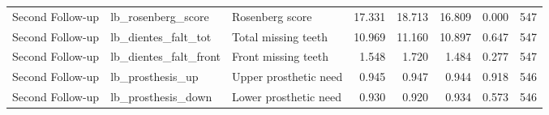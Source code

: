 \begin{table}
\begin{tabular}[t]{lllrrrrr}
Second Follow-up & lb\_rosenberg\_score & Rosenberg score & 17.331 & 18.713 & 16.809 & 0.000 & 547\\
Second Follow-up & lb\_dientes\_falt\_tot & Total missing teeth & 10.969 & 11.160 & 10.897 & 0.647 & 547\\
Second Follow-up & lb\_dientes\_falt\_front & Front missing teeth & 1.548 & 1.720 & 1.484 & 0.277 & 547\\
Second Follow-up & lb\_prosthesis\_up & Upper prosthetic need & 0.945 & 0.947 & 0.944 & 0.918 & 546\\
\addlinespace
Second Follow-up & lb\_prosthesis\_down & Lower prosthetic need & 0.930 & 0.920 & 0.934 & 0.573 & 546\\
\bottomrule
\end{tabular}
\end{table}
